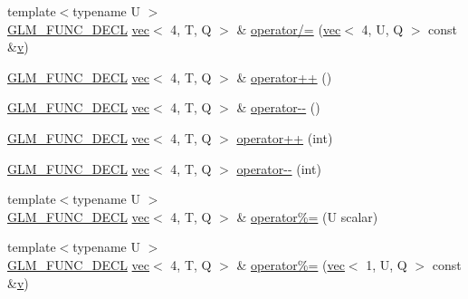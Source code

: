\begin{DoxyCompactItemize}
\item 
{\footnotesize template$<$typename U $>$ }\\\hyperlink{setup_8hpp_ab2d052de21a70539923e9bcbf6e83a51}{G\+L\+M\+\_\+\+F\+U\+N\+C\+\_\+\+D\+E\+CL} \hyperlink{structglm_1_1vec}{vec}$<$ 4, T, Q $>$ \& \hyperlink{structglm_1_1vec_3_014_00_01_t_00_01_q_01_4_aba90aef1a5d08c44f2ca6be9684bf1cd}{operator/=} (\hyperlink{structglm_1_1vec}{vec}$<$ 4, U, Q $>$ const \&\hyperlink{_s_d_l__opengl_8h_a10a82eabcb59d2fcd74acee063775f90}{v})
\item 
\hyperlink{setup_8hpp_ab2d052de21a70539923e9bcbf6e83a51}{G\+L\+M\+\_\+\+F\+U\+N\+C\+\_\+\+D\+E\+CL} \hyperlink{structglm_1_1vec}{vec}$<$ 4, T, Q $>$ \& \hyperlink{structglm_1_1vec_3_014_00_01_t_00_01_q_01_4_a8729def59c3f8b14075332c8603dd5c7}{operator++} ()
\item 
\hyperlink{setup_8hpp_ab2d052de21a70539923e9bcbf6e83a51}{G\+L\+M\+\_\+\+F\+U\+N\+C\+\_\+\+D\+E\+CL} \hyperlink{structglm_1_1vec}{vec}$<$ 4, T, Q $>$ \& \hyperlink{structglm_1_1vec_3_014_00_01_t_00_01_q_01_4_a1aa18c4fcac90cabb4f8cb2e467d4d9f}{operator-\/-\/} ()
\item 
\hyperlink{setup_8hpp_ab2d052de21a70539923e9bcbf6e83a51}{G\+L\+M\+\_\+\+F\+U\+N\+C\+\_\+\+D\+E\+CL} \hyperlink{structglm_1_1vec}{vec}$<$ 4, T, Q $>$ \hyperlink{structglm_1_1vec_3_014_00_01_t_00_01_q_01_4_a622a107338ed3355458bf43b9e078b7b}{operator++} (int)
\item 
\hyperlink{setup_8hpp_ab2d052de21a70539923e9bcbf6e83a51}{G\+L\+M\+\_\+\+F\+U\+N\+C\+\_\+\+D\+E\+CL} \hyperlink{structglm_1_1vec}{vec}$<$ 4, T, Q $>$ \hyperlink{structglm_1_1vec_3_014_00_01_t_00_01_q_01_4_ae095dbcd5c299033774aef2f534e9a26}{operator-\/-\/} (int)
\item 
{\footnotesize template$<$typename U $>$ }\\\hyperlink{setup_8hpp_ab2d052de21a70539923e9bcbf6e83a51}{G\+L\+M\+\_\+\+F\+U\+N\+C\+\_\+\+D\+E\+CL} \hyperlink{structglm_1_1vec}{vec}$<$ 4, T, Q $>$ \& \hyperlink{structglm_1_1vec_3_014_00_01_t_00_01_q_01_4_a4887bc32b7edf48fc28dcfaca51f4172}{operator\%=} (U scalar)
\item 
{\footnotesize template$<$typename U $>$ }\\\hyperlink{setup_8hpp_ab2d052de21a70539923e9bcbf6e83a51}{G\+L\+M\+\_\+\+F\+U\+N\+C\+\_\+\+D\+E\+CL} \hyperlink{structglm_1_1vec}{vec}$<$ 4, T, Q $>$ \& \hyperlink{structglm_1_1vec_3_014_00_01_t_00_01_q_01_4_af2437a9e70535d7ae0c01c7be439c209}{operator\%=} (\hyperlink{structglm_1_1vec}{vec}$<$ 1, U, Q $>$ const \&\hyperlink{_s_d_l__opengl_8h_a10a82eabcb59d2fcd74acee063775f90}{v})

\end{DoxyCompactItemize}
